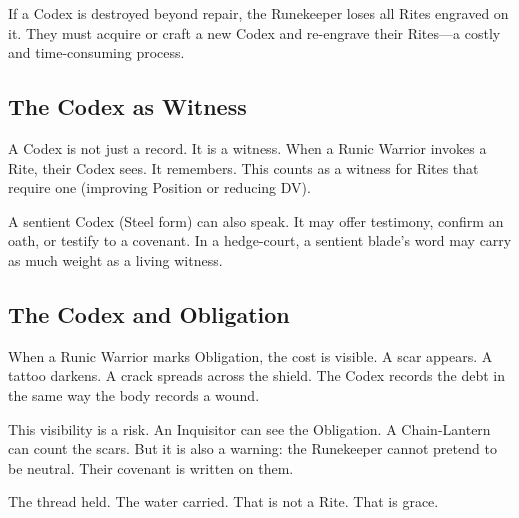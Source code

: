If a Codex is destroyed beyond repair, the Runekeeper loses all Rites engraved on it. They must acquire or craft a new Codex and re-engrave their Rites—a costly and time-consuming process.

\subsection{The Codex as Witness}

A Codex is not just a record. It is a witness. When a Runic Warrior invokes a Rite, their Codex sees. It remembers. This counts as a witness for Rites that require one (improving Position or reducing DV).

A sentient Codex (Steel form) can also speak. It may offer testimony, confirm an oath, or testify to a covenant. In a hedge-court, a sentient blade's word may carry as much weight as a living witness.

\subsection{The Codex and Obligation}

When a Runic Warrior marks Obligation, the cost is visible. A scar appears. A tattoo darkens. A crack spreads across the shield. The Codex records the debt in the same way the body records a wound.

This visibility is a risk. An Inquisitor can see the Obligation. A Chain-Lantern can count the scars. But it is also a warning: the Runekeeper cannot pretend to be neutral. Their covenant is written on them.

The thread held. The water carried. That is not a Rite. That is grace.
